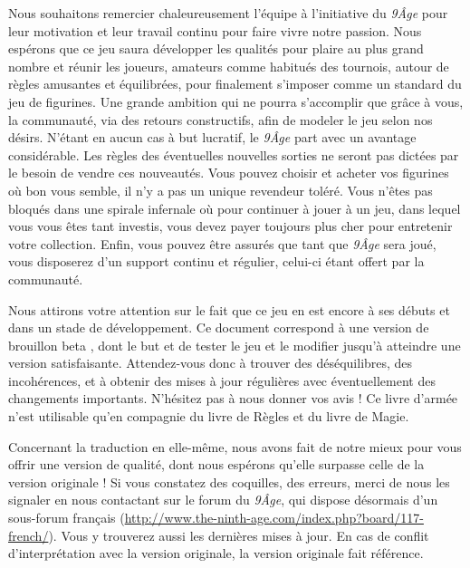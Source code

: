 \begin{titlepage}
\begin{center}
\end{center}

\newpage

\thispagestyle{empty}

{\fontsize{12}{14.4}\selectfont
{}
\vspace{0.5cm}

Nous souhaitons remercier chaleureusement l'équipe à l'initiative du \emph{9\ieme Âge} pour leur motivation et leur travail continu pour faire vivre notre passion. Nous espérons que ce jeu saura développer les qualités pour plaire au plus grand nombre et réunir les joueurs, amateurs comme habitués des tournois, autour de règles amusantes et équilibrées, pour finalement s'imposer comme un standard du jeu de figurines. Une grande ambition qui ne pourra s'accomplir que grâce à vous, la communauté, via des retours constructifs, afin de modeler le jeu selon nos désirs. N'étant en aucun cas à but lucratif, le \emph{9\ieme Âge} part avec un avantage considérable. Les règles des éventuelles nouvelles sorties ne seront pas dictées par le besoin de vendre ces nouveautés. Vous pouvez choisir et acheter vos figurines où bon vous semble, il n'y a pas un unique revendeur toléré. Vous n'êtes pas bloqués dans une spirale infernale où pour continuer à jouer à un jeu, dans lequel vous vous êtes tant investis, vous devez payer toujours plus cher pour entretenir votre collection. Enfin, vous pouvez être assurés que tant que \emph{9\ieme Âge} sera joué, vous disposerez d'un support continu et régulier, celui-ci étant offert par la communauté.

Nous attirons votre attention sur le fait que ce jeu en est encore à ses débuts et dans un stade de développement. Ce document correspond à une version de brouillon \og beta \fg , dont le but et de tester le jeu et le modifier jusqu'à atteindre une version satisfaisante. Attendez-vous donc à trouver des déséquilibres, des incohérences, et à obtenir des mises à jour régulières avec éventuellement des changements importants. N'hésitez pas à nous donner vos avis ! Ce livre d'armée n'est utilisable qu'en compagnie du livre de Règles et du livre de Magie.

Concernant la traduction en elle-même, nous avons fait de notre mieux pour vous offrir une version de qualité, dont nous espérons qu'elle surpasse celle de la version originale ! Si vous constatez des coquilles, des erreurs, merci de nous les signaler en nous contactant sur le forum du \emph{9\ieme Âge}, qui dispose désormais d'un sous-forum français (\url{http://www.the-ninth-age.com/index.php?board/117-french/}). Vous y trouverez aussi les dernières mises à jour. En cas de conflit d'interprétation avec la version originale, la version originale fait référence.

}
\end{titlepage}
